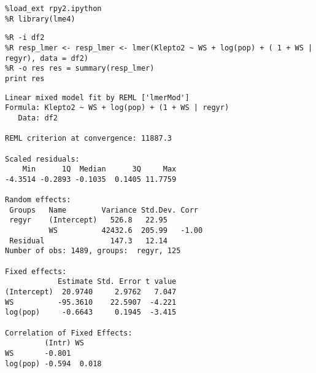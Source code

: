 \documentclass[12pt,fleqn]{article}\usepackage{common}
\begin{document}
\begin{verbatim}
%load_ext rpy2.ipython
%R library(lme4)
\end{verbatim}

\begin{verbatim}
%R -i df2
%R resp_lmer <- resp_lmer <- lmer(Klepto2 ~ WS + log(pop) + ( 1 + WS | regyr), data = df2)
%R -o res res = summary(resp_lmer)
print res
\end{verbatim}

\begin{verbatim}
Linear mixed model fit by REML ['lmerMod']
Formula: Klepto2 ~ WS + log(pop) + (1 + WS | regyr)
   Data: df2

REML criterion at convergence: 11887.3

Scaled residuals: 
    Min      1Q  Median      3Q     Max 
-4.3514 -0.2893 -0.1035  0.1405 11.7759 

Random effects:
 Groups   Name        Variance Std.Dev. Corr 
 regyr    (Intercept)   526.8   22.95        
          WS          42432.6  205.99   -1.00
 Residual               147.3   12.14        
Number of obs: 1489, groups:  regyr, 125

Fixed effects:
            Estimate Std. Error t value
(Intercept)  20.9740     2.9762   7.047
WS          -95.3610    22.5907  -4.221
log(pop)     -0.6643     0.1945  -3.415

Correlation of Fixed Effects:
         (Intr) WS    
WS       -0.801       
log(pop) -0.594  0.018

\end{verbatim}
\end{document}
